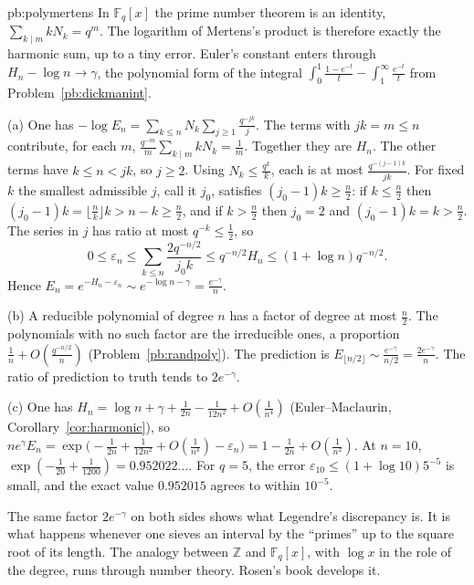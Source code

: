 \begin{solution}{pb:polymertens}
\idea In $\mathbb F_q[x]$ the prime number theorem is an identity, $\sum_{k\mid m}kN_k=q^m$. The logarithm of Mertens's product is therefore exactly the harmonic sum, up to a tiny
error. Euler's constant enters through $H_n-\log n\to\gamma$, the polynomial form of the integral $\int_0^1\frac{1-e^{-t}}t-\int_1^\infty\frac{e^{-t}}t$ from Problem~\ref{pb:dickmanint}.

\writeup (a) One has $-\log E_n=\sum_{k\le n}N_k\sum_{j\ge1}\frac{q^{-jk}}j$. The terms with $jk=m\le n$ contribute, for each $m$, $\frac{q^{-m}}m\sum_{k\mid m}kN_k=\frac1m$. Together they are $H_n$.
The other terms have $k\le n<jk$, so $j\ge2$. Using $N_k\le\frac{q^k}k$, each is at most $\frac{q^{-(j-1)k}}{jk}$. For fixed $k$ the smallest admissible $j$, call it $j_0$, satisfies $(j_0-1)k\ge\frac n2$:
if $k\le\frac n2$ then $(j_0-1)k=\lfloor\frac nk\rfloor k>n-k\ge\frac n2$, and if $k>\frac n2$ then $j_0=2$ and $(j_0-1)k=k>\frac n2$. The series in $j$ has ratio at most $q^{-k}\le\frac12$, so
\[
0\le\varepsilon_n\le\sum_{k\le n}\frac{2q^{-n/2}}{j_0k}\le q^{-n/2}H_n\le(1+\log n)q^{-n/2}.
\]
Hence $E_n=e^{-H_n-\varepsilon_n}\sim e^{-\log n-\gamma}=\frac{e^{-\gamma}}n$.

(b) A reducible polynomial of degree $n$ has a factor of degree at most $\frac n2$. The polynomials with no such factor are the irreducible ones, a proportion $\frac1n+O(\frac{q^{-n/2}}n)$
(Problem~\ref{pb:randpoly}). The prediction is $E_{\lfloor n/2\rfloor}\sim\frac{e^{-\gamma}}{n/2}=\frac{2e^{-\gamma}}n$. The ratio of prediction to truth tends to $2e^{-\gamma}$.

(c) One has $H_n=\log n+\gamma+\frac1{2n}-\frac1{12n^2}+O(\frac1{n^4})$ (Euler--Maclaurin, Corollary~\ref{cor:harmonic}), so $ne^\gamma E_n=\exp\bigl(-\frac1{2n}+\frac1{12n^2}+O(\frac1{n^4})-\varepsilon_n\bigr)=1-\frac1{2n}+O(\frac1{n^2})$.
At $n=10$, $\exp(-\frac1{20}+\frac1{1200})=0.952022\ldots$. For $q=5$, the error $\varepsilon_{10}\le(1+\log10)5^{-5}$ is small, and the exact value $0.952015$ agrees to within $10^{-5}$.

\leads The same factor $2e^{-\gamma}$ on both sides shows what Legendre's discrepancy is. It is what happens whenever one sieves an interval by the ``primes'' up to the
square root of its length. The analogy between $\mathbb Z$ and $\mathbb F_q[x]$, with $\log x$ in the role of the degree, runs through number theory. Rosen's book develops it.
\end{solution}


